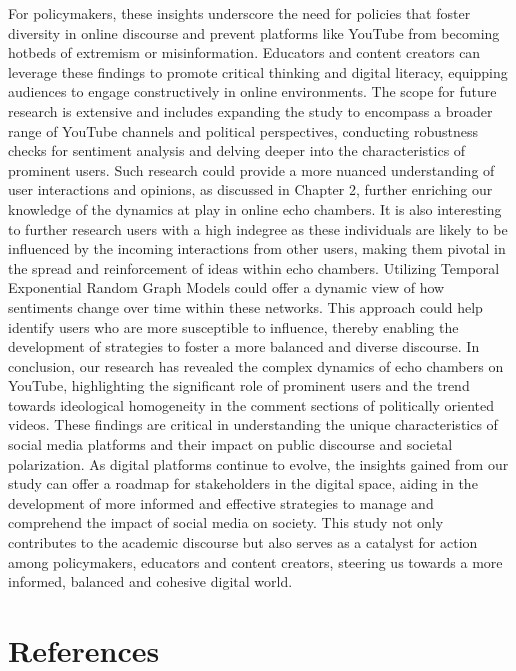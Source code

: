 \documentclass[
  man,floatsintext]{apa6}
\begin{document}
For policymakers, these insights underscore the need for policies that foster diversity in online discourse and prevent platforms like YouTube from becoming hotbeds of extremism or misinformation. Educators and content creators can leverage these findings to promote critical thinking and digital literacy, equipping audiences to engage constructively in online environments.
The scope for future research is extensive and includes expanding the study to encompass a broader range of YouTube channels and political perspectives, conducting robustness checks for sentiment analysis and delving deeper into the characteristics of prominent users. Such research could provide a more nuanced understanding of user interactions and opinions, as discussed in Chapter 2, further enriching our knowledge of the dynamics at play in online echo chambers. It is also interesting to further research users with a high indegree as these individuals are likely to be influenced by the incoming interactions from other users, making them pivotal in the spread and reinforcement of ideas within echo chambers. Utilizing Temporal Exponential Random Graph Models could offer a dynamic view of how sentiments change over time within these networks. This approach could help identify users who are more susceptible to influence, thereby enabling the development of strategies to foster a more balanced and diverse discourse.
In conclusion, our research has revealed the complex dynamics of echo chambers on YouTube, highlighting the significant role of prominent users and the trend towards ideological homogeneity in the comment sections of politically oriented videos. These findings are critical in understanding the unique characteristics of social media platforms and their impact on public discourse and societal polarization. As digital platforms continue to evolve, the insights gained from our study can offer a roadmap for stakeholders in the digital space, aiding in the development of more informed and effective strategies to manage and comprehend the impact of social media on society. This study not only contributes to the academic discourse but also serves as a catalyst for action among policymakers, educators and content creators, steering us towards a more informed, balanced and cohesive digital world.

\newpage

\section*{References}\label{references}
\end{document}
